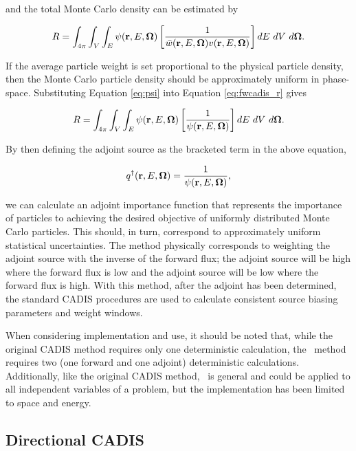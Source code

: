 \noindent and the total Monte Carlo density can be estimated by

\begin{equation}
R = \int_{4\pi}\int_{V}\int_{E}\psi(\textbf{r},E,\mathbf\Omega)
\left[\frac{1}{\bar{w}(\textbf{r},E,\mathbf\Omega)v(\textbf{r},E,\mathbf\Omega)}\right]dE\ dV\ d\mathbf\Omega.
\label{eq:fwcadis_r}
\end{equation}

If the average particle weight is set proportional to the physical particle density,
then the Monte Carlo particle density should be approximately uniform in phase-space.
Substituting Equation \ref{eq:psi} into Equation \ref{eq:fwcadis_r} gives %

\begin{equation}
R = \int_{4\pi}\int_{V}\int_{E}\psi(\textbf{r},E,\mathbf\Omega)
\left[\frac{1}{\psi(\textbf{r},E,\mathbf\Omega)}\right]dE\ dV\ d\mathbf\Omega.
\end{equation}

\noindent By then defining the adjoint source as the bracketed term in the above
equation,

\begin{equation}
q^{\dagger}(\textbf{r},E,\mathbf\Omega) = \frac{1}{\psi(\textbf{r},E,\mathbf\Omega)},
\end{equation}

\noindent we can calculate an adjoint importance function that represents the
importance of particles to achieving the desired objective of uniformly distributed
Monte Carlo particles. This should, in turn, correspond to approximately uniform
statistical uncertainties. The method physically corresponds to weighting the adjoint
source with the inverse of the forward flux; the adjoint source will be high where the
forward flux is low and the adjoint source will be low where the forward flux is high.
With this method, after the adjoint has been determined, the standard CADIS procedures
are used to calculate consistent source biasing parameters and weight windows.

When considering implementation and use, it should be noted that, while the original
CADIS method requires only one deterministic calculation, the \fwc\ method requires
two (one forward and one adjoint) deterministic calculations. Additionally, like the
original CADIS method, \fwc\ is general and could be applied to all independent
variables of a problem, but the implementation has been limited to space and energy. 

\subsection{Directional CADIS}

